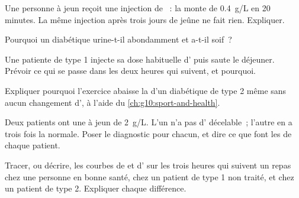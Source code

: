 \begin{exercise}[$\star\star$]\label{exo:g12:glucose-and-diabetes:8}
Une personne à jeun reçoit une injection de ~: la 
monte de \qty{0.4}{g/L} en 20 minutes. La même injection après trois
jours de jeûne ne fait rien. Expliquer.
\end{exercise}

\begin{exercise}[$\star\star$]\label{exo:g12:glucose-and-diabetes:9}
Pourquoi un diabétique urine-t-il abondamment et a-t-il soif~?
\end{exercise}

\begin{exercise}[$\star\star$]\label{exo:g12:glucose-and-diabetes:10}
Une patiente de type 1 injecte sa dose habituelle d' puis
saute le déjeuner. Prévoir ce qui se passe dans les deux heures qui
suivent, et pourquoi.
\end{exercise}

\begin{exercise}[$\star\star$]\label{exo:g12:glucose-and-diabetes:11}
Expliquer pourquoi l'exercice abaisse la  d'un diabétique de
type 2 même sans aucun changement d', à l'aide du
\cref{ch:g10:sport-and-health}.
\end{exercise}

\begin{exercise}[$\star\star\star$]\label{exo:g12:glucose-and-diabetes:12}
Deux patients ont une  à jeun de \qty{2}{g/L}. L'un n'a pas
d' décelable~; l'autre en a trois fois la normale. Poser le
diagnostic pour chacun, et dire ce que font les  de chaque
patient.
\end{exercise}

\begin{exercise}[$\star\star\star$]\label{exo:g12:glucose-and-diabetes:13}
Tracer, ou décrire, les courbes de  et d' sur les
trois heures qui suivent un repas chez une personne en bonne santé,
chez un patient de type 1 non traité, et chez un patient de type 2.
Expliquer chaque différence.
\end{exercise}

